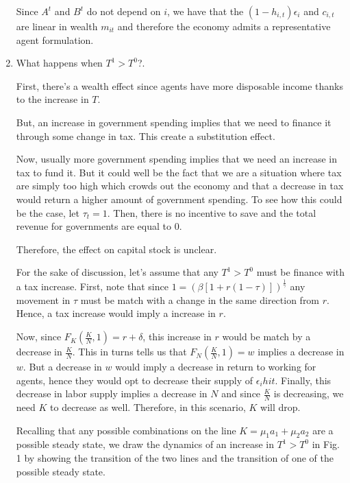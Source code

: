 \documentclass[12pt]{article}
\newcommand{\1}{{\bf 1}} %
\begin{document}
\begin{enumerate}[(1)]
	Since $A^{t}$ and $B^{t}$ do not depend on $i$, we have that the $(1-h_{i,t})\epsilon_i$ and $c_{i,t}$ are linear in wealth $m_{it}$ and therefore the economy admits a representative agent formulation.
	
	\item 
	

What happens when $T^1>T^0$?. 

First, there's a wealth effect since agents have more disposable income thanks to the increase in $T$. 

But, an increase in government spending implies that we need to finance it through some change in tax. This create a substitution effect. 

Now, usually more government spending implies that we need an increase in tax to fund it. But it could well be the fact that we are a situation where tax are simply too high which crowds out the economy and that a decrease in tax would return a higher amount of government spending. To see how this could be the case, let $\tau_t=1$. Then, there is no incentive to save and the total revenue for governments are equal to $0$.

Therefore, the effect on capital stock is unclear.

For the sake of discussion, let's assume that any $T^1>T^0$ must be finance with a tax increase. First, note that since $1 =  \left( \beta [1+r(1-\tau)]\right)^{\frac{1}{\gamma}}$ any movement in $\tau$ must be match with a change in the same direction from $r$. Hence, a tax increase would imply a increase in $r$.

Now, since $F_K(\frac{K}{N},1)=r+\delta$, this increase in $r$ would be match by a decrease in $\frac{K}{N}$. This in turns tells us that $F_N(\frac{K}{N},1)=w$ implies a decrease in $w$. But a decrease in $w$ would imply a decrease in return to working for agents, hence they would opt to decrease their supply of $\epsilon_i h{it}$. Finally, this decrease in labor supply implies a decrease in $N$ and since $\frac{K}{N}$ is decreasing, we need $K$ to decrease as well. Therefore, in this scenario, $K$ will drop.

Recalling that any possible combinations on the line $K = \mu_1a_{1} + \mu_2a_{2}$ are a possible steady state, we draw the dynamics of an increase in $T^1>T^0$ in Fig. 1 by showing the transition of the two lines and the transition of one of the possible steady state.	
	\begin{figure}[H]
	
	\begin{center}
\end{center}
\end{figure}
\end{enumerate}
\end{document}
